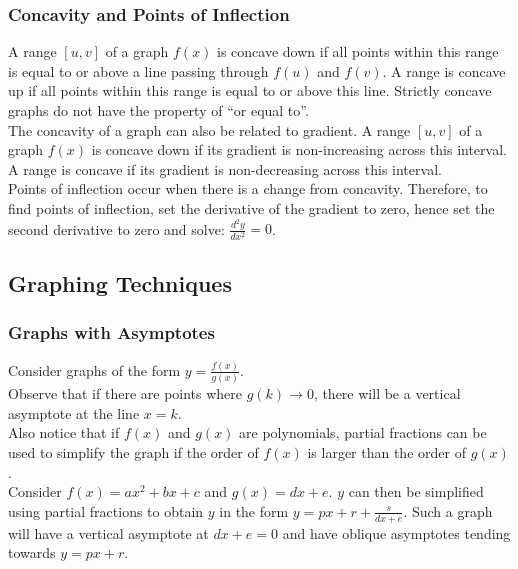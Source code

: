 \documentclass[../main]{subfiles}
\begin{document}
	\subsubsection{Concavity and Points of Inflection}

	A range \([u,v]\) of a graph \(f(x)\) is concave down if all points within this range is equal to or above a line passing through \(f(u)\) and \(f(v)\). A range is concave up if all points within this range is equal to or above this line. Strictly concave graphs do not have the property of ``or equal to''. \\

	The concavity of a graph can also be related to gradient. A range \([u,v]\) of a graph \(f(x)\) is concave down if its gradient is  non-increasing across this interval. A range is concave if its gradient is non-decreasing across this interval. \\

	Points of inflection occur when there is a change from concavity. Therefore, to find points of inflection, set the derivative of the gradient to zero, hence set the second derivative to zero and solve: \(\frac{d^2y}{dx^2} = 0\).

\subsection{Graphing Techniques}

	\subsubsection{Graphs with Asymptotes}

	Consider graphs of the form \(y = \frac{f(x)}{g(x)}\). \\

	Observe that if there are points where \(g(k) \rightarrow 0\), there will be a vertical asymptote at the line \(x=k\). \\

	Also notice that if \(f(x)\) and \(g(x)\) are polynomials, partial fractions can be used to simplify the graph if the order of \(f(x)\) is larger than the order of \(g(x)\). \\

	Consider \(f(x) = ax^2 + bx + c\) and \(g(x) = dx + e\). \(y\) can then be simplified using partial fractions to obtain \(y\) in the form \(y = px + r + \frac{s}{dx+e}\). Such a graph will have a vertical asymptote at \(dx+e=0\) and have oblique asymptotes tending towards \(y = px + r\). \\
\end{document}
